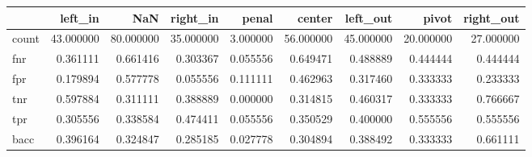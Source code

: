 \begin{tabular}{lrrrrrrrr}
\toprule
{} &    left\_in &        NaN &   right\_in &     penal &     center &   left\_out &      pivot &  right\_out \\
\midrule
count &  43.000000 &  80.000000 &  35.000000 &  3.000000 &  56.000000 &  45.000000 &  20.000000 &  27.000000 \\
fnr   &   0.361111 &   0.661416 &   0.303367 &  0.055556 &   0.649471 &   0.488889 &   0.444444 &   0.444444 \\
fpr   &   0.179894 &   0.577778 &   0.055556 &  0.111111 &   0.462963 &   0.317460 &   0.333333 &   0.233333 \\
tnr   &   0.597884 &   0.311111 &   0.388889 &  0.000000 &   0.314815 &   0.460317 &   0.333333 &   0.766667 \\
tpr   &   0.305556 &   0.338584 &   0.474411 &  0.055556 &   0.350529 &   0.400000 &   0.555556 &   0.555556 \\
bacc  &   0.396164 &   0.324847 &   0.285185 &  0.027778 &   0.304894 &   0.388492 &   0.333333 &   0.661111 \\
\bottomrule
\end{tabular}
